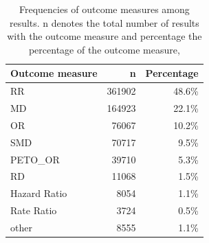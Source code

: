 \documentclass[11pt,a4paper,twoside]{book}\usepackage[]{graphicx}\usepackage[]{color}
\begin{document}
\begin{table}[ht]
\centering
\begingroup\footnotesize
\begin{tabular}{lrr}
  \hline
Outcome measure & n & Percentage \\ 
  \hline
RR & 361902 & 48.6\% \\ 
  MD & 164923 & 22.1\% \\ 
  OR & 76067 & 10.2\% \\ 
  SMD & 70717 & 9.5\% \\ 
  PETO\_OR & 39710 & 5.3\% \\ 
  RD & 11068 & 1.5\% \\ 
  Hazard Ratio & 8054 & 1.1\% \\ 
  Rate Ratio & 3724 & 0.5\% \\ 
  other & 8555 & 1.1\% \\ 
   \hline
\end{tabular}
\endgroup
\caption{Frequencies of outcome measures among results. n denotes the total number 
             of results with the outcome measure and percentage the percentage of the outcome measure,} 
\label{outcome.measure.frequencies}
\end{table}
\end{document}
